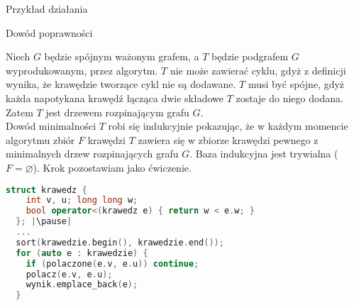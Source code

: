 \documentclass[../main.tex]{subfiles}
\begin{document}
\begin{frame}{\subsecname}{Przykład działania}
\end{frame}

\begin{frame}{\subsecname}{Dowód poprawności}

Niech $G$ będzie spójnym ważonym grafem, a $T$ będzie podgrafem $G$ wyprodukowanym, przez algorytm. 
\pause
$T$ nie może zawierać cyklu, gdyż z definicji wynika, że krawędzie tworzące cykl nie są dodawane. 
$T$ musi być spójne, gdyż każda napotykana krawędź łącząca dwie składowe $T$ zostaje do niego 
dodana. Zatem $T$ jest drzewem rozpinającym grafu $G$.\\
\pause
Dowód minimalności $T$ robi się indukcyjnie pokazując, że w każdym momencie algorytmu zbiór $F$
krawędzi $T$ zawiera się w zbiorze krawędzi pewnego z minimalnych drzew rozpinających grafu $G$.
Baza indukcyjna jest trywialna ($F = \varnothing$). 
\pause
Krok pozostawiam jako ćwiczenie.

\end{frame}

\begin{frame}[fragile]{\subsecname}

\begin{block}{}
\begin{lstlisting}[language = C++]
  struct krawedz {
    int v, u; long long w;
    bool operator<(krawedz e) { return w < e.w; }
  }; |\pause|
  ...
  sort(krawedzie.begin(), krawedzie.end());
  for (auto e : krawedzie) {
    if (polaczone(e.v, e.u)) continue;
    polacz(e.v, e.u);
    wynik.emplace_back(e);
  }
\end{lstlisting}
\end{block}

\end{frame}
\end{document}
